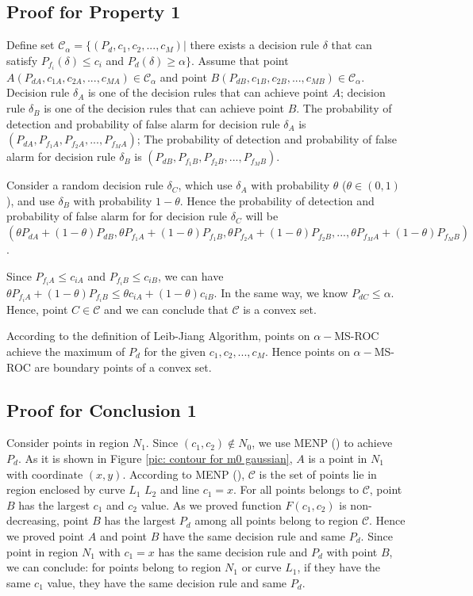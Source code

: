 \documentclass[12pt,journal,a4paper,twoside,onecolumn]{IEEEtran}
\newcommand{\rmnum}[1]{\romannumeral #1}
\begin{document}
\begin{spacing}{2.5}
\subsection{Proof for Property 1}
Define set $\mathcal{C}_\alpha = \{
(P_d, c_1, c_2, ..., c_M)|$ there exists a decision rule $\delta$ that can satisfy $P_{f_i}(\delta) \leq c_i$  and $P_d(\delta) \geq \alpha
\}$.
Assume that point $A(P_{dA}, c_{1A}, c_{2A}, ..., c_{MA}) \in \mathcal{C}_\alpha$ and point $B(P_{dB}, c_{1B}, c_{2B}, ..., c_{MB}) \in \mathcal{C}_\alpha$. Decision rule $\delta_A$ is one of the decision rules that can achieve point $A$; decision rule $\delta_B$ is one of the decision rules that can achieve point $B$. The probability of detection and probability of false alarm for decision rule $\delta_A$ is $(P_{dA}, P_{f_1A}, P_{f_2A}, ..., P_{f_MA})$; The probability of detection and probability of false alarm for decision rule $\delta_B$ is $(P_{dB}, P_{f_1B}, P_{f_2B}, ..., P_{f_MB})$.

Consider a random decision rule $\delta_C$, which use $\delta_A$ with probability $\theta$ ($\theta \in (0, 1)$), and use $\delta_B$ with probability $1 - \theta$. Hence the probability of detection and probability of false alarm for for decision rule $\delta_C$ will be $(\theta P_{dA} + (1 - \theta)P_{dB}, \theta P_{f_1A} + (1 - \theta)P_{f_1B}, \theta P_{f_2A} + (1 - \theta)P_{f_2B}, ..., \theta P_{f_MA} + (1 - \theta)P_{f_MB})$.

Since $P_{f_iA} \leq c_{iA}$ and $P_{f_iB} \leq c_{iB}$, we can have $\theta P_{f_iA} + (1 - \theta)P_{f_iB} \leq \theta c_{iA} + (1 - \theta)c_{iB}$. In the same way, we know $P_{dC} \leq \alpha$. Hence, point $C \in \mathcal{C}$ and  we can conclude that $\mathcal{C}$ is a convex set.

According to the definition of Leib-Jiang Algorithm, points on $\alpha-$MS-ROC achieve the maximum of $P_d$ for the given $c_1, c_2, ..., c_M$. Hence points on  $\alpha-$MS-ROC are boundary points of  a convex set.

\subsection{Proof for Conclusion 1}

Consider points in region $N_1$. Since $(c_1, c_2) \notin N_0$, we use MENP (\rmnum{2}) to achieve $P_d$. As it is shown in Figure \ref{pic: contour for m0 gaussian}, $A$ is a point in $N_1$ with coordinate $(x, y)$. According to MENP (\rmnum{2}), $\mathcal{C}$ is the set of points lie in region enclosed by curve $L_1$ $L_2$ and line $c_1 = x$. For all points belongs to $\mathcal{C}$, point $B$ has the largest $c_1$ and $c_2$ value. As we proved function $F(c_1, c_2)$ is non-decreasing, point $B$ has the largest $P_d$ among all points belong to region $\mathcal{C}$. Hence we proved point $A$ and point $B$ have the same decision rule and same $P_d$. Since point in region $N_1$ with $c_1 = x$ has the same decision rule and $P_d$ with point $B$, we can conclude: for points belong to region $N_1$ or curve $L_1$, if they have the same $c_1$ value, they have the same decision rule and same $P_d$.


\end{spacing}
\end{document}
